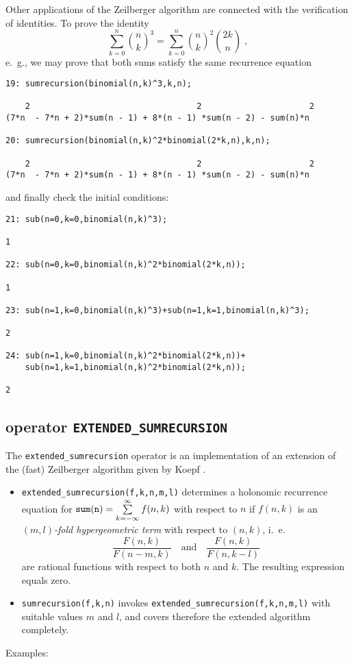 Other applications of the Zeilberger algorithm are connected with
the verification of identities. To prove the identity
\[
\sum_{k=0}^n
{{n}\choose{k}}^3
=
\sum_{k=0}^n
{{n}\choose{k}}^2 {{2k}\choose{n}}
\;,
\]
e.\ g., we may prove that both sums satisfy the same recurrence equation

{\small
\begin{verbatim}
19: sumrecursion(binomial(n,k)^3,k,n);

    2                                  2                      2
(7*n  - 7*n + 2)*sum(n - 1) + 8*(n - 1) *sum(n - 2) - sum(n)*n

20: sumrecursion(binomial(n,k)^2*binomial(2*k,n),k,n);

    2                                  2                      2
(7*n  - 7*n + 2)*sum(n - 1) + 8*(n - 1) *sum(n - 2) - sum(n)*n
\end{verbatim}
}\noindent
and finally check the initial conditions:

{\small
\begin{verbatim}
21: sub(n=0,k=0,binomial(n,k)^3);

1

22: sub(n=0,k=0,binomial(n,k)^2*binomial(2*k,n));

1

23: sub(n=1,k=0,binomial(n,k)^3)+sub(n=1,k=1,binomial(n,k)^3);

2

24: sub(n=1,k=0,binomial(n,k)^2*binomial(2*k,n))+
    sub(n=1,k=1,binomial(n,k)^2*binomial(2*k,n));

2
\end{verbatim}
}\noindent

\subsection{\REDUCE{} operator {\tt EXTENDED\_SUMRECURSION}}
\label{sec:EXTENDED_SUMRECURSION}

The {\tt extended\verb+_+sumrecursion} operator is an implementation 
of an extension of the (fast) Zeilberger algorithm given by Koepf
\cite{Koepf}.
\begin{itemize}
\item
{\tt extended\verb+_+sumrecursion(f,k,n,m,l)} determines a holonomic recurrence 
equation for ${\tt sum(n)} =\sum\limits_{k=-\infty}^\infty f(n,k)$ 
with respect to $n$ if $f(n,k)$ is an {\sl $(m,l)$-fold hypergeometric term} 
with respect to $(n,k)$, i.\ e.\
\[
\frac{F(n,k)}{F(n-m,k)}
\quad
\mbox{and}
\quad
\frac{F(n,k)}{F(n,k-l)}
\]
are rational functions with respect to both $n$ and $k$.
The resulting expression equals zero.
\item
{\tt sumrecursion(f,k,n)} invokes {\tt extended\verb+_+sumrecursion(f,k,n,m,l)}
with suitable values $m$ and $l$, and covers therefore the extended
algorithm completely.
\end{itemize}
Examples:


